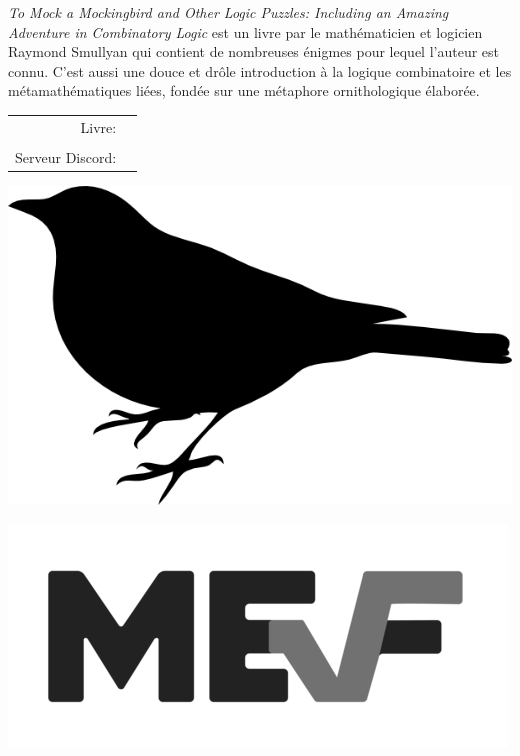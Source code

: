 \documentclass[letterpaper]{article}
\begin{document}


\emph{To Mock a Mockingbird and Other Logic Puzzles: Including an Amazing Adventure in Combinatory Logic} est un livre par le math\'ematicien et logicien Raymond Smullyan qui contient de nombreuses \'enigmes pour lequel l'auteur est connu. C'est aussi une douce et dr\^ole introduction \`a la logique combinatoire et les m\'etamath\'ematiques li\'ees, fond\'ee sur une m\'etaphore ornithologique \'elabor\'ee.

\vspace{0.75in}
\begin{tabular}{rl}
    \csctimefont Livre: &  \\
    & \\
    \csctimefont Serveur Discord: &
\end{tabular}

\vspace{0.5in}
\begin{center}
\includegraphics[scale = 0.75]{mockingbird_logo.png}
\end{center}

\vspace{-15pt}
\vspace{-15pt}
\centering {}

\raggedleft
\includegraphics[scale = 0.5]{mef_logo.png}
\end{document}
